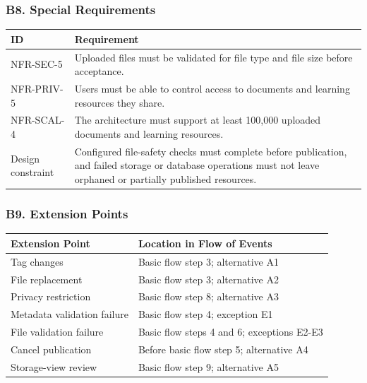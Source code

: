 \documentclass[12pt]{article}
\renewcommand{\baselinestretch}{1.5}
\begin{document}
\subsubsection*{B8. Special Requirements}
\par\medskip

\begingroup
\small
\renewcommand{\baselinestretch}{1.0}\selectfont
\renewcommand{\arraystretch}{1.15}
\setlength{\tabcolsep}{6pt}
\begin{longtable}{|>{\raggedright\arraybackslash}p{}|>{\raggedright\arraybackslash}p{}|}
\hline
\textbf{ID} & \textbf{Requirement} \\ \hline
\endhead
NFR-SEC-5 & Uploaded files must be validated for file type and file size before acceptance. \\ \hline
NFR-PRIV-5 & Users must be able to control access to documents and learning resources they share. \\ \hline
NFR-SCAL-4 & The architecture must support at least 100,000 uploaded documents and learning resources. \\ \hline
Design constraint & Configured file-safety checks must complete before publication, and failed storage or database operations must not leave orphaned or partially published resources. \\ \hline
\end{longtable}
\endgroup
\par\medskip

\hypertarget{sec:b9-extension-points}{}
\subsubsection*{B9. Extension Points}
\par\medskip

\begingroup
\small
\renewcommand{\baselinestretch}{1.0}\selectfont
\renewcommand{\arraystretch}{1.15}
\setlength{\tabcolsep}{6pt}
\begin{longtable}{|>{\raggedright\arraybackslash}p{}|>{\raggedright\arraybackslash}p{}|}
\hline
\textbf{Extension Point} & \textbf{Location in Flow of Events} \\ \hline
\endhead
Tag changes & Basic flow step 3; alternative A1 \\ \hline
File replacement & Basic flow step 3; alternative A2 \\ \hline
Privacy restriction & Basic flow step 8; alternative A3 \\ \hline
Metadata validation failure & Basic flow step 4; exception E1 \\ \hline
File validation failure & Basic flow steps 4 and 6; exceptions E2-E3 \\ \hline
Cancel publication & Before basic flow step 5; alternative A4 \\ \hline
Storage-view review & Basic flow step 9; alternative A5 \\ \hline
\end{longtable}
\endgroup
\par\medskip
\end{document}
